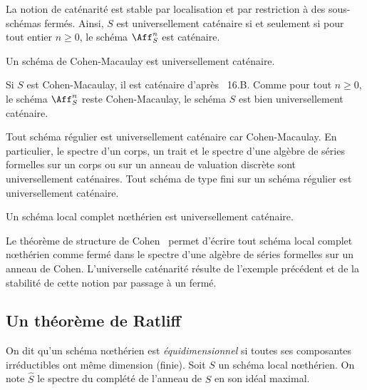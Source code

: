 \documentclass[10pt]{../fichiers-configuration-latex/smfart}
\begin{document}
La notion de caténarité est stable par localisation et par restriction à des sous-schémas fermés.
Ainsi, $S$ est universellement caténaire si et seulement si pour tout entier $n\geq 0$, le schéma
$\Aff^n_S$ est caténaire.

\begin{lemme2} \label{14-lemme-CohenMac-implique-univ-cat}  Un schéma de Cohen-Macaulay est
universellement caténaire.  \end{lemme2}

\begin{démo} Si $S$ est Cohen-Macaulay, il est caténaire d'après \cite{CA@Matsumura}~16.B. Comme
pour tout $n\geq 0$, le schéma $\Aff^n_S$ reste Cohen-Macaulay, le schéma $S$ est bien
universellement caténaire.  \end{démo}

\begin{exemple2}\label{14-exemple-regulier-implique-univ-cat}  Tout schéma régulier est
universellement caténaire car Cohen-Macaulay. En particulier, le spectre d'un corps, un trait et le
spectre d'une algèbre de séries formelles sur un corps ou sur un anneau de valuation discrète sont
universellement caténaires. Tout schéma de type fini sur un schéma régulier est universellement
caténaire.  \end{exemple2}

\begin{proposition2} \label{14-prop-complet-univ-cat} Un schéma local
complet nœthérien est universellement caténaire.  \end{proposition2}

\begin{démo} Le théorème de structure de Cohen~ permet d'écrire tout schéma
local complet nœthérien comme fermé dans le spectre d'une algèbre de séries formelles sur un anneau
de Cohen. L'universelle caténarité résulte de l'exemple précédent et de la stabilité de cette notion
par passage à un fermé.  \end{démo}

\subsection{Un théorème de Ratliff}

On dit qu'un schéma nœthérien est \emph{équidimensionnel} si toutes ses composantes irréductibles
ont même dimension (finie). Soit $S$ un schéma local nœthérien. On note $\widehat{S}$ le spectre du
complété de l'anneau de $S$ en son idéal maximal.
\end{document}
